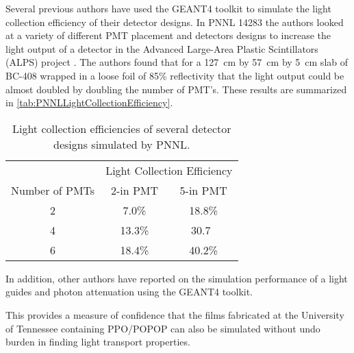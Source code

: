 Several previous authors have used the GEANT4 toolkit to simulate the light collection efficiency of their detector designs.
In PNNL 14283 the authors looked at a variety of different PMT placement and detectors designs to increase the light output of a detector in the Advanced Large-Area Plastic Scintillators (ALPS) project \cite{pnnl_14283}.
The authors found that for a \SI{127}{\cm} by \SI{57}{\cm} by \SI{5}{\cm} slab of BC-408 wrapped in a loose foil of 85\% reflectivity that the light output could be almost doubled by doubling the number of PMT's.
These results are summarized in \autoref{tab:PNNLLightCollectionEfficiency}.
\begin{table}
  \centering
  \caption[PNNL Light Collection Efficiencies]{Light collection efficiencies of several detector designs simulated by PNNL\cite{pnnl_14283}.}
  \label{tab:PNNLLightCollectionEfficiency}
  \begin{tabular}{c|c c}
  \toprule
  & \multicolumn{2}{c}{Light Collection Efficiency} \\
  Number of PMTs  & 2-in PMT & 5-in PMT \\
  \midrule
  2 & 7.0\% & 18.8\% \\
  4 & 13.3\% & 30.7\ \\
  6 & 18.4\% & 40.2\% \\
  \bottomrule
  \end{tabular}
\end{table}
In addition, other authors have reported on the simulation performance of a light guides and photon attenuation using the GEANT4 toolkit.


This provides a measure of confidence that the films fabricated at the University of Tennessee containing PPO/POPOP can also be simulated without undo burden in finding light transport properties.
